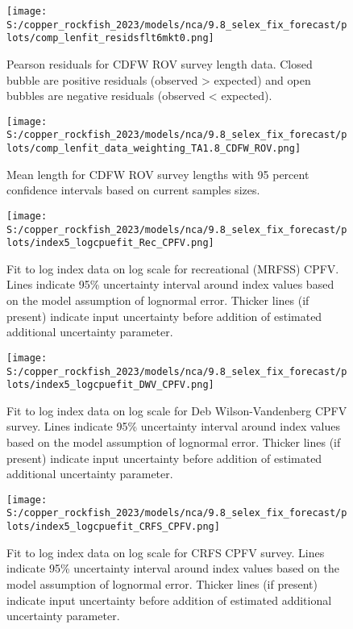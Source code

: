 \documentclass[
  letterpaper,
]{article}
\begin{document}
\pagebreak

\begin{figure}
\centering
\texttt{[image: S:/copper\_rockfish\_2023/models/nca/9.8\_selex\_fix\_forecast/plots/comp\_lenfit\_residsflt6mkt0.png]}
\caption{Pearson residuals for CDFW ROV survey length data. Closed bubble are positive residuals (observed \textgreater{} expected) and open bubbles are negative residuals (observed \textless{} expected).\label{fig:rov-pearson}}
\end{figure}

\pagebreak

\begin{figure}
\centering
\texttt{[image: S:/copper\_rockfish\_2023/models/nca/9.8\_selex\_fix\_forecast/plots/comp\_lenfit\_data\_weighting\_TA1.8\_CDFW\_ROV.png]}
\caption{Mean length for CDFW ROV survey lengths with 95 percent confidence intervals based on current samples sizes.\label{fig:rov-mean-len-fit}}
\end{figure}

\pagebreak

\begin{figure}
\centering
\texttt{[image: S:/copper\_rockfish\_2023/models/nca/9.8\_selex\_fix\_forecast/plots/index5\_logcpuefit\_Rec\_CPFV.png]}
\caption{Fit to log index data on log scale for recreational (MRFSS) CPFV. Lines indicate 95\% uncertainty interval around index values based on the model assumption of lognormal error. Thicker lines (if present) indicate input uncertainty before addition of estimated additional uncertainty parameter.\label{fig:mrfss-cpfv-index-fit}}
\end{figure}

\pagebreak

\begin{figure}
\centering
\texttt{[image: S:/copper\_rockfish\_2023/models/nca/9.8\_selex\_fix\_forecast/plots/index5\_logcpuefit\_DWV\_CPFV.png]}
\caption{Fit to log index data on log scale for Deb Wilson-Vandenberg CPFV survey. Lines indicate 95\% uncertainty interval around index values based on the model assumption of lognormal error. Thicker lines (if present) indicate input uncertainty before addition of estimated additional uncertainty parameter.\label{fig:dwv-cpfv-index-fit}}
\end{figure}

\pagebreak

\begin{figure}
\centering
\texttt{[image: S:/copper\_rockfish\_2023/models/nca/9.8\_selex\_fix\_forecast/plots/index5\_logcpuefit\_CRFS\_CPFV.png]}
\caption{Fit to log index data on log scale for CRFS CPFV survey. Lines indicate 95\% uncertainty interval around index values based on the model assumption of lognormal error. Thicker lines (if present) indicate input uncertainty before addition of estimated additional uncertainty parameter.\label{fig:crfs-cpfv-index-fit}}
\end{figure}
\end{document}
